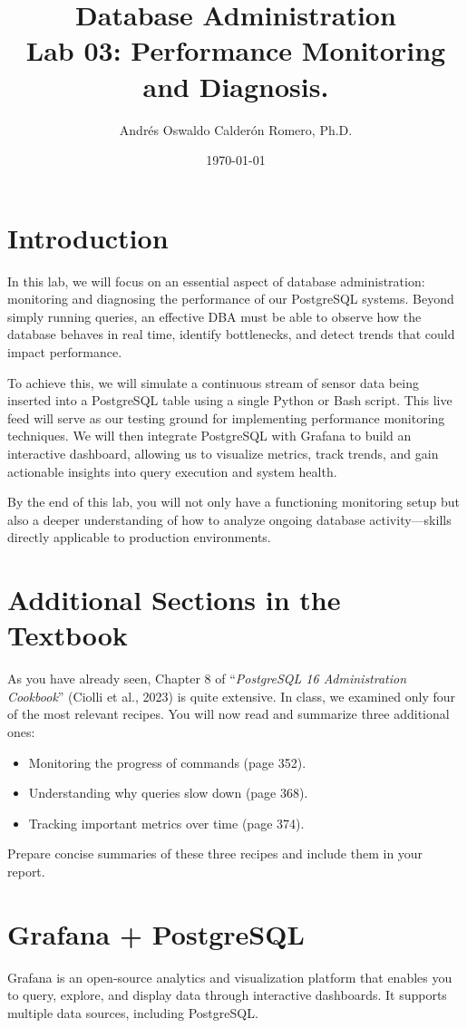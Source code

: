 \documentclass{article}
\title{Database Administration \\ Lab 03: Performance Monitoring and Diagnosis.}
\author{Andrés Oswaldo Calderón Romero, Ph.D.}
\date{\today}
\begin{document}
\maketitle

\section{Introduction}
In this lab, we will focus on an essential aspect of database administration: monitoring and diagnosing the performance of our PostgreSQL systems. Beyond simply running queries, an effective DBA must be able to observe how the database behaves in real time, identify bottlenecks, and detect trends that could impact performance.

To achieve this, we will simulate a continuous stream of sensor data being inserted into a PostgreSQL table using a single Python or Bash script. This live feed will serve as our testing ground for implementing performance monitoring techniques. We will then integrate PostgreSQL with Grafana to build an interactive dashboard, allowing us to visualize metrics, track trends, and gain actionable insights into query execution and system health.

By the end of this lab, you will not only have a functioning monitoring setup but also a deeper understanding of how to analyze ongoing database activity—skills directly applicable to production environments.


\section{Additional Sections in the Textbook} \label{sec:recipes}
As you have already seen, Chapter 8 of ``\textit{PostgreSQL 16 Administration Cookbook}'' (Ciolli et al., 2023) is quite extensive. In class, we examined only four of the most relevant recipes. You will now read and summarize three additional ones:

\begin{itemize}
    \item Monitoring the progress of commands (page 352).
    \item Understanding why queries slow down (page 368).
    \item Tracking important metrics over time (page 374).
\end{itemize}

Prepare concise summaries of these three recipes and include them in your report.

\section{Grafana + PostgreSQL} \label{sec:grafana}
Grafana is an open-source analytics and visualization platform that enables you to query, explore, and display data through interactive dashboards. It supports multiple data sources, including PostgreSQL.
\end{document}
